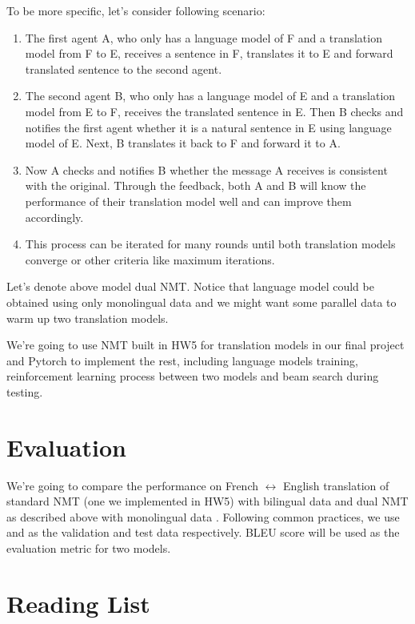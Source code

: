 \documentclass[11pt]{article}
\begin{document}
To be more specific, let's consider following scenario:
\begin{enumerate}[label*=\arabic*.]
\item The first agent A, who only has a language model of F and a translation model from F to E, receives a sentence in F, translates it to E and forward translated sentence to the second agent.

\item The second agent B, who only has a language model of E and a translation model from E to F, receives the translated sentence in E. Then B checks and notifies the first agent whether it is a natural sentence in E using language model of E. Next, B translates it back to F and forward it to A.

\item Now A checks and notifies B whether the message A receives is consistent with the original. Through the feedback, both A and B will know the performance of their translation model well and can improve them accordingly.

\item This process can be iterated for many rounds until both translation models converge or other criteria like maximum iterations.
\end{enumerate}
Let's denote above model dual NMT. Notice that language model could be obtained using only monolingual data and we might want some parallel data to warm up two translation models.

We're going to use NMT built in HW5 for translation models in our final project and Pytorch to implement the rest, including language models training,  reinforcement learning process between two models and beam search during testing.
\part{Evaluation}
We're going to compare the performance on French $\leftrightarrow$ English translation of standard NMT (one we implemented in HW5) with bilingual data \href{http://www.statmt.org/europarl/}{\color{blue}{Europarl v7}} and dual NMT as described above with monolingual data \href{http://www.statmt.org/wmt17/translation-task.html}{\color{blue}{News Crawl: articles from 2010}}.  Following common practices, we use \href{http://data.statmt.org/wmt16/translation-task/dev.tgz}{\color{blue}{news-test2012}} and \href{http://data.statmt.org/wmt16/translation-task/dev.tgz}{\color{blue}{news-test2013}} as the validation and test data respectively.  BLEU score will be used as the evaluation metric for two models.
\part{Reading List}
\begingroup
\renewcommand{\section}[2]{}


\nocite{*}
\endgroup
\end{document}
